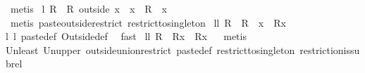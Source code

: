 \begin{isabellebody}
\ metis%
\endisatagproof
{\isafoldproof}%
%
\isadelimproof
\isanewline
%
\endisadelimproof
\isanewline
{}\isamarkupfalse%
\ l{}{}{\isacharcolon}\ {\isachardoublequoteopen}R\ {\isacharequal}\ {\isacharparenleft}R\ outside\ {\isacharbraceleft}x{\isacharbraceright}{\isacharparenright}\ {\isacharplus}{\isacharasterisk}\ {\isacharparenleft}{\isacharbraceleft}x{\isacharbraceright}\ {\isasymtimes}\ {\isacharparenleft}R\ {\isacharbackquote}{\isacharbackquote}\ {\isacharbraceleft}x{\isacharbraceright}{\isacharparenright}{\isacharparenright}{\isachardoublequoteclose}\ \isanewline
%
\isadelimproof
%
\endisadelimproof
%
\isatagproof
{}\isamarkupfalse%
\ {\isacharparenleft}metis\ paste{\isacharunderscore}outside{\isacharunderscore}restrict\ restrict{\isacharunderscore}to{\isacharunderscore}singleton{\isacharparenright}%
\endisatagproof
{\isafoldproof}%
%
\isadelimproof
\isanewline
%
\endisadelimproof
\isanewline
{}\isamarkupfalse%
\ ll{}{}{\isacharcolon}\ {\isachardoublequoteopen}R\ {\isasymsubseteq}\ R\ {\isacharplus}{\isacharasterisk}\ {\isacharparenleft}{\isacharbraceleft}x{\isacharbraceright}\ {\isasymtimes}\ {\isacharparenleft}R{\isacharbackquote}{\isacharbackquote}{\isacharbraceleft}x{\isacharbraceright}{\isacharparenright}{\isacharparenright}{\isachardoublequoteclose}%
\isadelimproof
\ %
\endisadelimproof
%
\isatagproof
{}\isamarkupfalse%
\ \isanewline
l{}{}\ l{}{}\ paste{\isacharunderscore}def\ Outside{\isacharunderscore}def\ \isamarkupfalse%
\ fast%
\endisatagproof
{\isafoldproof}%
%
\isadelimproof
%
\endisadelimproof
\isanewline
\isanewline
{}\isamarkupfalse%
\ ll{}{}{\isacharcolon}\ {\isachardoublequoteopen}R\ {\isasymsupseteq}\ R{\isacharplus}{\isacharasterisk}{\isacharparenleft}{\isacharbraceleft}x{\isacharbraceright}\ {\isasymtimes}\ {\isacharparenleft}R{\isacharbackquote}{\isacharbackquote}{\isacharbraceleft}x{\isacharbraceright}{\isacharparenright}{\isacharparenright}{\isachardoublequoteclose}%
\isadelimproof
\ %
\endisadelimproof
%
\isatagproof
{}\isamarkupfalse%
\ {\isacharparenleft}metis\ \isanewline
Un{\isacharunderscore}least\ Un{\isacharunderscore}upper{}\ outside{\isacharunderscore}union{\isacharunderscore}restrict\ paste{\isacharunderscore}def\ restrict{\isacharunderscore}to{\isacharunderscore}singleton\ restriction{\isacharunderscore}is{\isacharunderscore}subrel{\isacharparenright}%
\endisatagproof
{\isafoldproof}%

\end{isabellebody}
